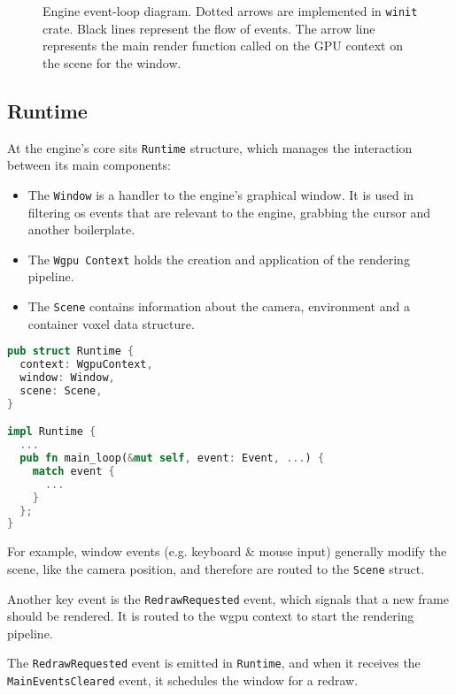 \begin{figure}[H]
  \centering
  
  \caption{Engine event-loop diagram. Dotted arrows are implemented in \texttt{winit} crate. Black lines represent the flow of events. The arrow line represents the main render function called on the GPU context on the scene for the window.}
\end{figure}


\subsection{Runtime}
\begin{samepage}
At the engine's core sits \texttt{Runtime}  structure, which manages the interaction between its main components:
\begin{itemize}
  \item The \texttt{Window} is a handler to the engine's graphical window. It is used in filtering \acrshort{os} events that are relevant to the engine, grabbing the cursor and another boilerplate.
  \item The \texttt{Wgpu Context} holds the creation and application of the rendering pipeline.
  \item The \texttt{Scene} contains information about the camera, environment and a container voxel data structure.
\end{itemize}
\end{samepage}

\begin{lstlisting}[language=rust,caption={Runtime definition},captionpos=b]
pub struct Runtime {
  context: WgpuContext,
  window: Window,
  scene: Scene,
}

impl Runtime {
  ...
  pub fn main_loop(&mut self, event: Event, ...) {
    match event {
      ...
    }
  };
}
\end{lstlisting}


For example, window events (e.g. keyboard \& mouse input) generally modify the scene, like the camera position, and therefore are routed to the \verb|Scene| struct.

Another key event is the \verb|RedrawRequested| event, which signals that a new frame should be rendered. It is routed to the wgpu context to start the rendering pipeline.

The \verb|RedrawRequested| event is emitted in \verb|Runtime|, and when it receives the \verb|MainEventsCleared| event, it schedules the window for a redraw.

